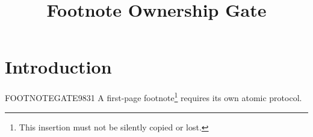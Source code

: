 \documentclass{tnqjournal}
\title{Footnote Ownership Gate}
\begin{document}
\maketitle
\section{Introduction}
FOOTNOTEGATE9831 A first-page footnote\footnote{This insertion must not be silently copied or lost.} requires its own atomic protocol.
\end{document}
